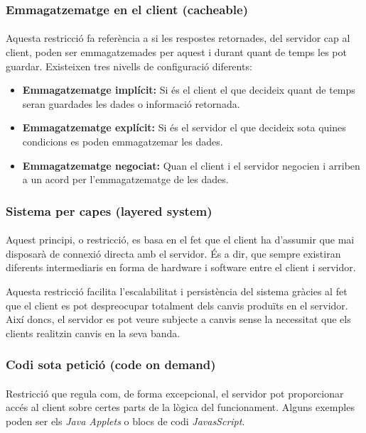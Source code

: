     \subsubsection{Emmagatzematge en el client (cacheable)}\label{section:42caching}

    \paragraph{}
    Aquesta restricció fa referència a si les respostes retornades, del servidor cap al client, poden ser emmagatzemades per aquest i durant quant de temps les pot guardar. Existeixen tres nivells de configuració diferents:

    \begin{itemize}
        \item \textbf{Emmagatzematge implícit:} Si és el client el que decideix quant de temps seran guardades les dades o informació retornada.
        \item \textbf{Emmagatzematge explícit:} Si és el servidor el que decideix sota quines condicions es poden emmagatzemar les dades.
        \item \textbf{Emmagatzematge negociat:} Quan el client i el servidor negocien i arriben a un acord per l'emmagatzematge de les dades.
    \end{itemize}


    \subsubsection{Sistema per capes (layered system)}

    \paragraph{}
    Aquest principi, o restricció, es basa en el fet que el client ha d'assumir que mai disposarà de connexió directa amb el servidor. És a dir, que sempre existiran diferents intermediaris en forma de hardware i software entre el client i servidor.

    Aquesta restricció facilita l’escalabilitat i persistència del sistema gràcies al fet que el client es pot despreocupar totalment dels canvis produïts en el servidor. Així doncs, el servidor es pot veure subjecte a canvis sense la necessitat que els clients realitzin canvis en la seva banda.


    \subsubsection{Codi sota petició (code on demand)}

    \paragraph{}
    Restricció que regula com, de forma excepcional, el servidor pot proporcionar accés al client sobre certes parts de la lògica del funcionament. Alguns exemples poden ser els \emph{Java Applets} o blocs de codi \emph{JavasScript}.
